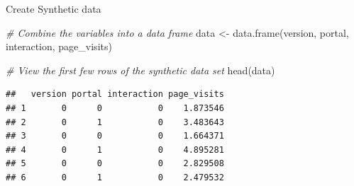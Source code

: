 \documentclass[
  ignorenonframetext,
]{beamer}
\newenvironment{Shaded}{\begin{snugshade}}{\end{snugshade}}
\newcommand{\CommentTok}[1]{\textcolor[rgb]{0.56,0.35,0.01}{\textit{#1}}}
\newcommand{\FunctionTok}[1]{\textcolor[rgb]{0.00,0.00,0.00}{#1}}
\newcommand{\NormalTok}[1]{#1}
\newcommand{\OtherTok}[1]{\textcolor[rgb]{0.56,0.35,0.01}{#1}}
\begin{document}
\begin{frame}[fragile]{Create Synthetic data}
\begin{Shaded}
\begin{Highlighting}[]
\CommentTok{\# Combine the variables into a data frame}
\NormalTok{data }\OtherTok{\textless{}{-}} \FunctionTok{data.frame}\NormalTok{(version, portal, interaction, page\_visits)}

\CommentTok{\# View the first few rows of the synthetic data set}
\FunctionTok{head}\NormalTok{(data)}
\end{Highlighting}
\end{Shaded}

\begin{verbatim}
##   version portal interaction page_visits
## 1       0      0           0    1.873546
## 2       0      1           0    3.483643
## 3       0      0           0    1.664371
## 4       0      1           0    4.895281
## 5       0      0           0    2.829508
## 6       0      1           0    2.479532
\end{verbatim}
\end{frame}
\end{document}
